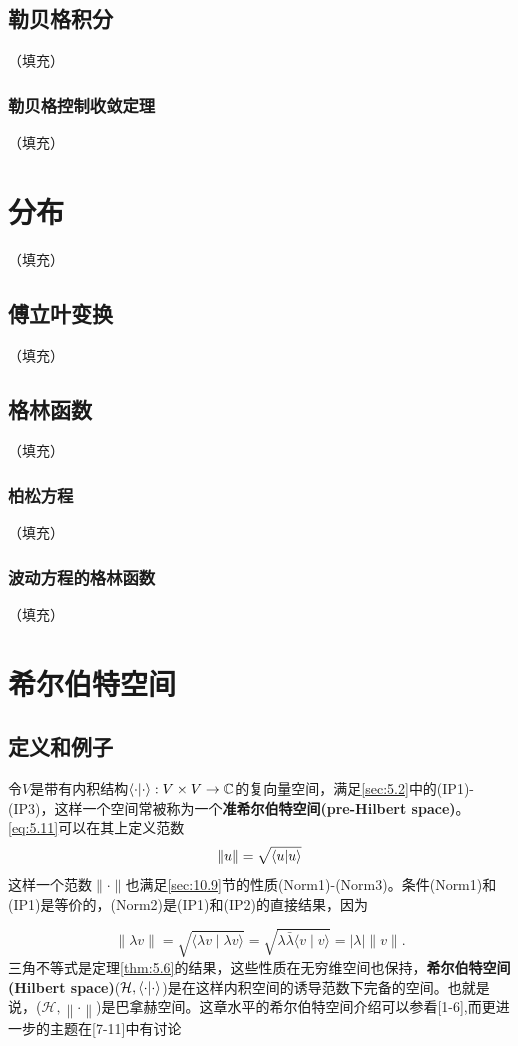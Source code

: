 \documentclass[hyperref,UTF8]{ctexbook}
\begin{document}
\section{勒贝格积分}（填充）
\subsection{勒贝格控制收敛定理}（填充）
\chapter{分布}（填充）


\section{傅立叶变换}（填充）
\section{格林函数}（填充）
\subsection{柏松方程}（填充）
\subsection{波动方程的格林函数}（填充）
\chapter{希尔伯特空间}
\section{定义和例子}
令$V$是带有内积结构\(\braket{\cdot|\cdot}:V\times V\rightarrow\mathbb{C}\)的复向量空间，满足\ref{sec:5.2}中的(IP1)-(IP3)，这样一个空间常被称为一个\textbf{准希尔伯特空间(pre-Hilbert space)}。\ref*{eq:5.11}可以在其上定义范数
\[\left\lVert u\right\rVert =\sqrt{\braket{u|u}}\]
这样一个范数\(\lVert \cdot\rVert \)也满足\ref{sec:10.9}节的性质(Norm1)-(Norm3)。条件(Norm1)和(IP1)是等价的，(Norm2)是(IP1)和(IP2)的直接结果，因为

\begin{equation}
    \|\lambda v\|=\sqrt{\langle\lambda v \mid \lambda v\rangle}=\sqrt{\lambda \bar{\lambda}\langle v \mid v\rangle}=|\lambda|\|v\| .
\end{equation}
三角不等式是定理\ref{thm:5.6}的结果，这些性质在无穷维空间也保持，\textbf{希尔伯特空间(Hilbert space)}(\(\mathcal{H},\braket{\cdot|\cdot}\))是在这样内积空间的诱导范数下完备的空间。也就是说，(\(\mathcal{H},\left\lVert \cdot\right\rVert \))是巴拿赫空间。这章水平的希尔伯特空间介绍可以参看[1-6],而更进一步的主题在[7-11]中有讨论
\end{document}
